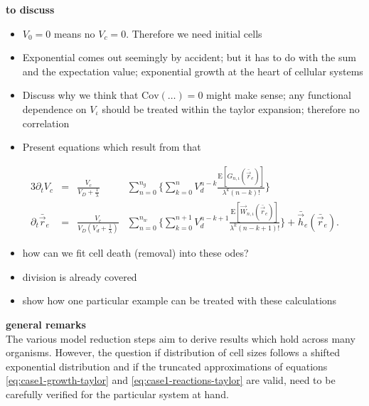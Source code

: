 \textbf{to discuss}
\begin{itemize}
    \item $V_0=0$ means no $V_c=0$. Therefore we need initial cells
    \item Exponential comes out seemingly by accident; but it has to do with the sum and the
        expectation value; exponential growth at the heart of cellular systems
\end{itemize}

\begin{itemize}
    \item Discuss why we think that $\text{Cov}(\dots)=0$ might make sense; any functional
        dependence on $V_\iota$ should be treated within the taylor expansion; therefore no
        correlation
    \item Present equations which result from that
\end{itemize}

\begin{alignat}{3}
    \partial_t V_c
    &= &\frac{V_c}{V_D+\frac{1}{\lambda}}&\sum\limits_{n=0}^{n_g}\Bigg\{\sum\limits_{k=0}^n
        V_d^{n-k}\frac{\text{E}[G_{n,\iota}(\bar{\vec{r}}_e)]}{\lambda^k(n-k)!}\Bigg\}\\
    \partial_t\bar{\vec{r}}_e
    &= &\frac{V_c}{V_D(V_d+\frac{1}{\lambda})}&\sum\limits_{n=0}^{n_w}\Bigg\{\sum\limits_{k=0}^{n+1}
        V_d^{n-k+1}\frac{\text{E}[\vec{W}_{n,\iota}(\bar{\vec{r}}_e)]}{\lambda^k(n-k+1)!}\Bigg\}
        + \bar{\vec{h}}_e(\bar{\vec{r}}_e).
\end{alignat}

\begin{itemize}
    \item how can we fit cell death (removal) into these \acp{ode}?
    \item division is already covered
    \item show how one particular example can be treated with these calculations
\end{itemize}


\textbf{general remarks}\\
The various model reduction steps aim to derive results which hold across many organisms.
However, the question if distribution of cell sizes follows a shifted exponential distribution and
if the truncated approximations of equations \eqref{eq:case1-growth-taylor} and
\eqref{eq:case1-reactions-taylor} are valid, need to be carefully verified for the particular system
at hand.


